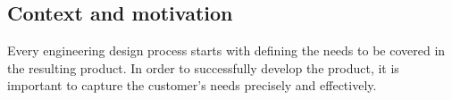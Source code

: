 


    \subsection*{Context and motivation}
    Every engineering design process starts with defining the needs to be covered in the resulting product. In order to successfully develop the product, it is important to capture the customer's needs precisely and effectively.~\cite{liu2012scenario}

